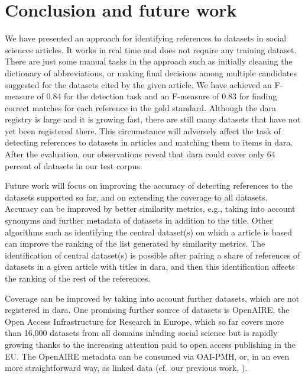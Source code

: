 \documentclass{IOS-Book-Article}
\newcommand{\dara}{\textsf{da\textbar ra}}
\begin{document}
\section{Conclusion and future work}
\label{sec:future}
We have presented an approach for identifying references to datasets in social sciences articles.
It works in real time and does not require any training dataset.
There are just some manual tasks in the approach such as initially cleaning the dictionary of abbreviations, or making final decisions among multiple candidates suggested for the datasets cited by the given article.
We have achieved an F-measure of 0.84 for the detection task and an F-measure of 0.83 for finding correct matches for each reference in the gold standard.  
Although the {\dara} registry is large and it is growing fast, there are still many datasets that have not yet been registered there. 
This circumstance will adversely affect the task of detecting references to datasets in articles and matching them to items in {\dara}.
After the evaluation, our observations reveal that {\dara} could cover only 64 percent of datasets in our test corpus. 

Future work will focus on improving the accuracy of detecting references to the datasets supported so far, and on extending the coverage to all datasets.
Accuracy can be improved by better similarity metrics, e.g., taking into account synonyms and further metadata of datasets in addition to the title.
Other algorithms such as identifying the central dataset(s) on which a article is based can improve the ranking of the list generated by similarity metrics.
The identification of central dataset(s) is possible after pairing a share of references of datasets in a given article with titles in {\dara}, and then this identification affects the ranking of the rest of the references. 

Coverage can be improved by 
taking into account further datasets, which are not registered in {\dara}.
One promising further source of datasets is OpenAIRE, the Open Access Infrastructure for Research in Europe, which so far covers more than 16,000 datasets from all domains inluding social science but is rapidly growing thanks to the increasing attention paid to open access publishing in the EU.
The OpenAIRE metadata can be consumed via OAI-PMH, or, in an even more straightforward way, as linked data (cf.\ our previous work, \citet{VahdatiEtAl:MappingResearchMetadata15}).
\end{document}
